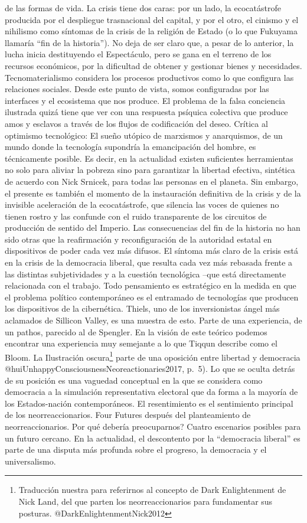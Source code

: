 \documentclass[
]{article}
\begin{document}
de las formas de vida. La crisis tiene dos caras: por un lado, la
ecocatástrofe producida por el despliegue trasnacional del capital, y
por el otro, el cinismo y el nihilismo como síntomas de la crisis de la
religión de Estado (o lo que Fukuyama llamaría ``fin de la historia'').
No deja de ser claro que, a pesar de lo anterior, la lucha inicia
destituyendo el Espectáculo, pero se gana en el terreno de los recursos
económicos, por la dificultad de obtener y gestionar bienes y
necesidades. Tecnomaterialismo considera los procesos productivos como
lo que configura las relaciones sociales. Desde este punto de vista,
somos configuradas por las interfaces y el ecosistema que nos produce.
El problema de la falsa conciencia ilustrada quizá tiene que ver con una
respuesta psíquica colectiva que produce amos y esclavos a través de los
flujos de codificación del deseo. Crítica al optimismo tecnológico: El
sueño utópico de marxismos y anarquismos, de un mundo donde la
tecnología supondría la emancipación del hombre, es técnicamente
posible. Es decir, en la actualidad existen suficientes herramientas no
solo para aliviar la pobreza sino para garantizar la libertad efectiva,
sintética de acuerdo con Nick Srnicek, para todas las personas en el
planeta. Sin embargo, el presente es también el momento de la
instauración definitiva de la crisis y de la invisible aceleración de la
ecocatástrofe, que silencia las voces de quienes no tienen rostro y las
confunde con el ruido transparente de los circuitos de producción de
sentido del Imperio. Las consecuencias del fin de la historia no han
sido otras que la reafirmación y reconfiguración de la autoridad estatal
en dispositivos de poder cada vez más difusos. El síntoma más claro de
la crisis está en la crisis de la democracia liberal, que resulta cada
vez más rebasada frente a las distintas subjetividades y a la cuestión
tecnológica --que está directamente relacionada con el trabajo. Todo
pensamiento es estratégico en la medida en que el problema político
contemporáneo es el entramado de tecnologías que producen los
dispositivos de la cibernética. Thiels, uno de los inversionistas ángel
más aclamados de Sillicon Valley, es una muestra de esto. Parte de una
experiencia, de un pathos, parecido al de Spengler. En la visión de este
teórico podemos encontrar una experiencia muy semejante a lo que Tiqqun
describe como el Bloom. La Ilustración oscura\footnote{Traducción
  nuestra para referirnos al concepto de Dark Enlightenment de Nick
  Land, del que parten los neorreaccionarios para fundamentar sus
  posturas. @DarkEnlightenmentNick2012} parte de una oposición entre
libertad y democracia @huiUnhappyConsciousnessNeoreactionaries2017,
p.~5). Lo que se oculta detrás de su posición es una vaguedad conceptual
en la que se considera como democracia a la simulación representativa
electoral que da forma a la mayoría de los Estados-nación
contemporáneos. El resentimiento es el sentimiento principal de los
neorreaccionarios. Four Futures después del planteamiento de
neorreaccionarios. Por qué debería preocuparnos? Cuatro escenarios
posibles para un futuro cercano. En la actualidad, el descontento por la
``democracia liberal'' es parte de una disputa más profunda sobre el
progreso, la democracia y el universalismo.
\end{document}

